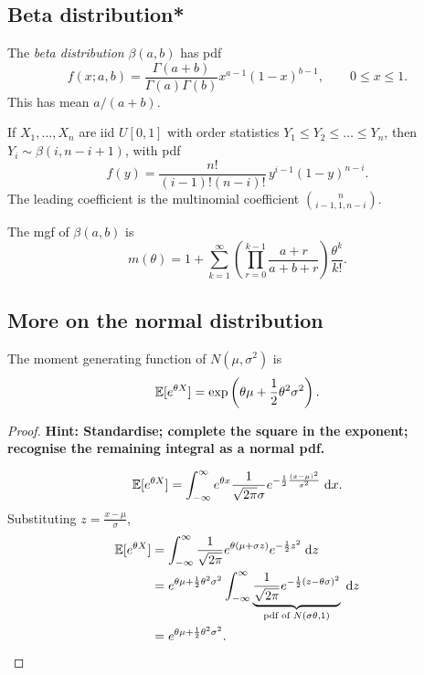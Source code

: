 \documentclass[a4paper]{article}
\begin{document}
\subsection{Beta distribution*}
\begin{defi}
  The \emph{beta distribution} $\beta(a, b)$ has pdf
  \[
    f(x; a, b) = \frac{\Gamma(a + b)}{\Gamma(a)\Gamma(b)}x^{a - 1}(1 - x)^{b - 1}, \qquad 0 \leq x \leq 1.
  \]
  This has mean $a/(a + b)$.
\end{defi}

\begin{prop}
  If $X_1, \dotsc, X_n$ are iid $U[0,1]$ with order statistics $Y_1 \leq Y_2 \leq \dotsc \leq Y_n$, then $Y_i \sim \beta(i, n - i + 1)$, with pdf
  \[
    f(y) = \frac{n!}{(i - 1)!(n - i)!}\,y^{i - 1}(1 - y)^{n - i}.
  \]
  The leading coefficient is the multinomial coefficient $\binom{n}{i - 1, 1, n - i}$.
\end{prop}

\begin{remark}
  The mgf of $\beta(a, b)$ is
  \[
    m(\theta) = 1 + \sum_{k = 1}^\infty \left(\prod_{r = 0}^{k - 1}\frac{a + r}{a + b + r}\right)\frac{\theta^k}{k!}.
  \]
\end{remark}

\subsection{More on the normal distribution}
\begin{prop}
  The moment generating function of $N(\mu, \sigma^2)$ is
  \[
    \mathbb{E}[e^{\theta X}] = \exp\left(\theta\mu + \frac{1}{2}\theta^2 \sigma^2\right).
  \]
\end{prop}

\begin{proof}
  \textbf{Hint: Standardise; complete the square in the exponent; recognise the remaining integral as a normal pdf.}

  \[
    \mathbb{E}[e^{\theta X}] = \int_{-\infty}^\infty e^{\theta x} \frac{1}{\sqrt{2\pi} \sigma} e^{-\frac{1}{2} \frac{(x - \mu)^2}{\sigma^2}}\;\mathrm{d} x.
  \]
  Substituting $z = \frac{x - \mu}{\sigma}$,
\begin{align*}
  \mathbb{E}[e^{\theta X}] &= \int_{-\infty}^\infty \frac{1}{\sqrt{2\pi}}e^{\theta(\mu + \sigma z)} e^{-\frac{1}{2}z^2}\;\mathrm{d} z\\
  &= e^{\theta\mu + \frac{1}{2}\theta^2\sigma^2}\int_{-\infty}^\infty \underbrace{\frac{1}{\sqrt{2\pi}}e^{-\frac{1}{2}(z - \theta \sigma)^2}}_{\text{pdf of }N(\sigma\theta, 1)}\;\mathrm{d} z\\
  &= e^{\theta\mu + \frac{1}{2}\theta^2\sigma^2}.\qedhere
\end{align*}
\end{proof}
\end{document}
